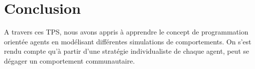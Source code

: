\documentclass[a4paper,12pt]{report}
\begin{document}
\section*{Conclusion}
A travers ces TPS, nous avons appris à apprendre le concept de programmation orientée agents en modélisant différentes simulations de comportements. On s'est rendu compte qu'à partir d'une stratégie individualiste de chaque agent, peut se dégager un comportement communautaire. 
\end{document}
